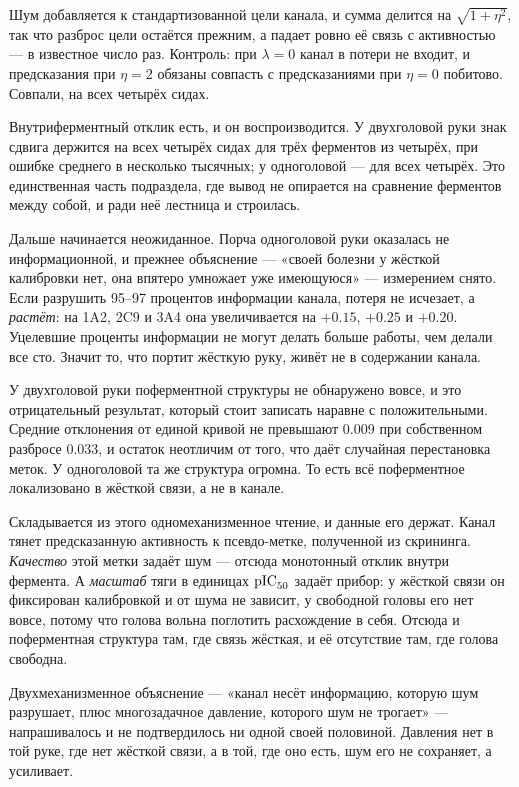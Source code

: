 Шум добавляется к стандартизованной цели канала, и сумма делится на $\sqrt{1+\eta^2}$, так что
разброс цели остаётся прежним, а падает ровно её связь с активностью --- в известное число раз.
Контроль: при $\lambda = 0$ канал в потери не входит, и предсказания при $\eta = 2$ обязаны
совпасть с предсказаниями при $\eta = 0$ побитово. Совпали, на всех четырёх сидах.

Внутрифермент\-ный отклик есть, и он воспроизводится. У двухголовой руки знак сдвига держится
на всех четырёх сидах для трёх ферментов из четырёх, при ошибке среднего в несколько тысячных;
у одноголовой --- для всех четырёх. Это единственная часть подраздела, где
вывод не опирается на сравнение ферментов между собой, и ради неё лестница и строилась.

Дальше начинается неожиданное. Порча одноголовой руки оказалась не информационной, и прежнее
объяснение --- «своей болезни у жёсткой калибровки нет, она впятеро умножает уже имеющуюся» ---
измерением снято. Если разрушить 95--97 процентов информации канала, потеря не исчезает, а
\emph{растёт}: на 1A2, 2C9 и 3A4 она увеличивается на $+0.15$, $+0.25$ и $+0.20$. Уцелевшие
проценты информации не могут делать больше работы, чем делали все сто. Значит то, что портит
жёсткую руку, живёт не в содержании канала.

У двухголовой руки поферментной структуры не обнаружено вовсе, и это отрицательный результат,
который стоит записать наравне с положительными. Средние отклонения от единой кривой не превышают 0.009 при собственном разбросе 0.033, и остаток
неотличим от того, что даёт случайная перестановка меток. У одноголовой та же структура
огромна. То есть всё поферментное локализовано в жёсткой связи, а не в канале.

Складывается из этого одномеханизменное чтение, и данные его держат. Канал тянет
предсказанную активность к псевдо-метке, полученной из скрининга. \emph{Качество} этой метки
задаёт шум --- отсюда монотонный отклик внутри фермента. А \emph{масштаб} тяги в единицах
$\mathrm{pIC}_{50}$ задаёт прибор: у жёсткой связи он фиксирован калибровкой и от шума не зависит, у
свободной головы его нет вовсе, потому что голова вольна поглотить расхождение в себя. Отсюда
и поферментная структура там, где связь жёсткая, и её отсутствие там, где голова свободна.

Двухмеханизменное объяснение --- «канал несёт информацию, которую шум разрушает, плюс
многозадачное давление, которого шум не трогает» --- напрашивалось и не подтвердилось ни одной
своей половиной. Давления нет в той руке, где нет жёсткой связи, а в той, где оно есть, шум его
не сохраняет, а усиливает.

